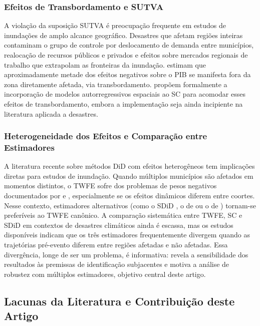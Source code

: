 \documentclass[a4paper,12pt]{article}
\begin{document}
\subsubsection{Efeitos de Transbordamento e SUTVA}

A violação da suposição SUTVA é preocupação frequente em estudos de inundações de
amplo alcance geográfico. Desastres que afetam regiões inteiras contaminam o grupo de
controle por deslocamento de demanda entre municípios, realocação de recursos públicos e
privados e efeitos sobre mercados regionais de trabalho que extrapolam as fronteiras da
inundação.  estimam que aproximadamente metade dos efeitos
negativos sobre o PIB se manifesta fora da zona diretamente afetada, via transbordamento.
 propõem formalmente a incorporação de modelos
autorregressivos espaciais ao SC para acomodar esses efeitos de transbordamento, embora a
implementação seja ainda incipiente na literatura aplicada a desastres.

\subsubsection{Heterogeneidade dos Efeitos e Comparação entre Estimadores}

A literatura recente sobre métodos DiD com efeitos heterogêneos tem implicações diretas
para estudos de inundação. Quando múltiplos municípios são afetados em momentos
distintos, o TWFE sofre dos problemas de pesos negativos documentados por
 e , especialmente se os
efeitos dinâmicos diferem entre coortes. Nesse contexto, estimadores alternativos (como
o SDiD \cite{arkhangelsky2021}, o de  ou o de
) tornam-se preferíveis ao TWFE canônico. A comparação
sistemática entre TWFE, SC e SDiD em contextos de desastres climáticos ainda é escassa,
mas os estudos disponíveis indicam que os três estimadores frequentemente divergem
quando as trajetórias pré-evento diferem entre regiões afetadas e não afetadas. Essa
divergência, longe de ser um problema, é informativa: revela a sensibilidade dos resultados
às premissas de identificação subjacentes e motiva a análise de robustez com múltiplos
estimadores, objetivo central deste artigo.

\subsection{Lacunas da Literatura e Contribuição deste Artigo}
\label{sub:lacunas}
\end{document}
